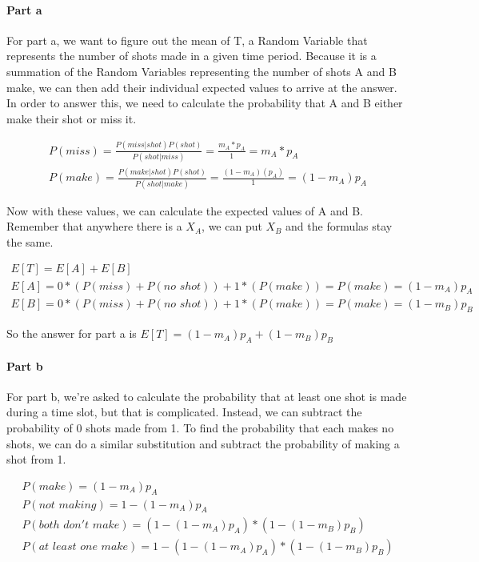 \documentclass[12pt]{article}
\begin{document}
\paragraph{Part a}
For part a, we want to figure out the mean of T, a Random Variable that represents the number of shots made in a given time period. Because it is a summation of the Random Variables representing the number of shots A and B make, we can then add their individual expected values to arrive at the answer. In order to answer this, we need to calculate the probability that A and B either make their shot or miss it.

\begin{gather*}
  P(miss) = \frac{P(miss | shot)P(shot)}{P(shot | miss)} = \frac{m_A * p_A}{1} = m_A * p_A \\
  P(make) = \frac{P(make | shot)P(shot)}{P(shot | make)} = \frac{(1 - m_A)(p_A)}{1} = (1 - m_A)p_A
\end{gather*}

Now with these values, we can calculate the expected values of A and B. Remember that anywhere there is a $X_A$, we can put $X_B$ and the formulas stay the same.

\begin{gather*}
  E[T] = E[A] + E[B]                                                            \\
  E[A] = 0 * (P(miss) + P(no\,\,shot)) + 1 * (P(make)) = P(make) = (1 - m_A)p_A \\
  E[B] = 0 * (P(miss) + P(no\,\,shot)) + 1 * (P(make)) = P(make) = (1 - m_B)p_B
\end{gather*}

So the answer for part a is $E[T] = (1 - m_A)p_A + (1 - m_B)p_B$

\paragraph{Part b} For part b, we're asked to calculate the probability that at least one shot is made during a time slot, but that is complicated. Instead, we can subtract the probability of 0 shots made from 1. To find the probability that each makes no shots, we can do a similar substitution and subtract the probability of making a shot from 1.

\begin{gather*}
  P(make) = (1 - m_A)p_A                                             \\
  P(not\,\,making) = 1 - (1 - m_A)p_A                                \\
  P(both\,\,don't\,\,make) = (1 - (1 - m_A)p_A) * (1 - (1 - m_B)p_B) \\
  P(at\,\,least\,\,one\,\,make) = 1 - (1 - (1 - m_A)p_A) * (1 - (1 - m_B)p_B)
\end{gather*}
\end{document}
